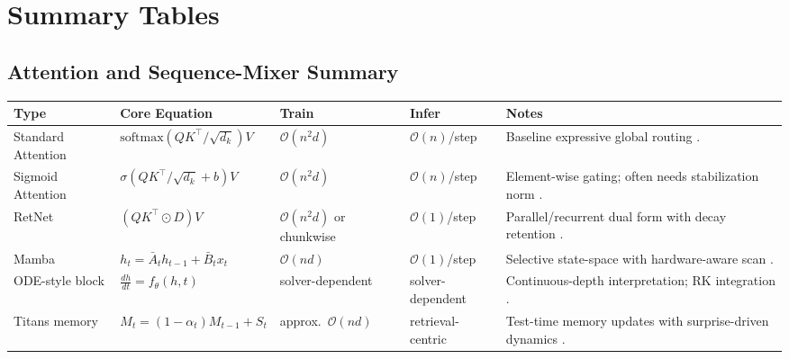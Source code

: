 \section{Summary Tables}
\label{sec:summary-tables}

\subsection{Attention and Sequence-Mixer Summary}
\small
\begin{longtable}{p{2.4cm}p{3.2cm}p{2.0cm}p{2.0cm}p{4.8cm}}
\toprule
\textbf{Type} & \textbf{Core Equation} & \textbf{Train} & \textbf{Infer} & \textbf{Notes} \\
\midrule
\endhead
Standard Attention & $\text{softmax}(QK^\top/\sqrt{d_k})V$ & $\mathcal{O}(n^2d)$ & $\mathcal{O}(n)$/step & Baseline expressive global routing \citep{vaswani_attention_2017}. \\
Sigmoid Attention & $\sigma(QK^\top/\sqrt{d_k}+b)V$ & $\mathcal{O}(n^2d)$ & $\mathcal{O}(n)$/step & Element-wise gating; often needs stabilization norm \citep{ramapuram_theory_2024}. \\
RetNet & $(QK^\top\odot D)V$ & $\mathcal{O}(n^2d)$ or chunkwise & $\mathcal{O}(1)$/step & Parallel/recurrent dual form with decay retention \citep{sun_retentive_2023}. \\
Mamba & $h_t=\bar{A}_t h_{t-1}+\bar{B}_t x_t$ & $\mathcal{O}(nd)$ & $\mathcal{O}(1)$/step & Selective state-space with hardware-aware scan \citep{gu_mamba_2023}. \\
ODE-style block & $\frac{dh}{dt}=f_\theta(h,t)$ & solver-dependent & solver-dependent & Continuous-depth interpretation; RK integration \citep{zhang_continuous_2021}. \\
Titans memory & $M_t=(1-\alpha_t)M_{t-1}+S_t$ & approx.\ $\mathcal{O}(nd)$ & retrieval-centric & Test-time memory updates with surprise-driven dynamics \citep{behrouz_titans_2025}. \\
\bottomrule
\end{longtable}
\normalsize

